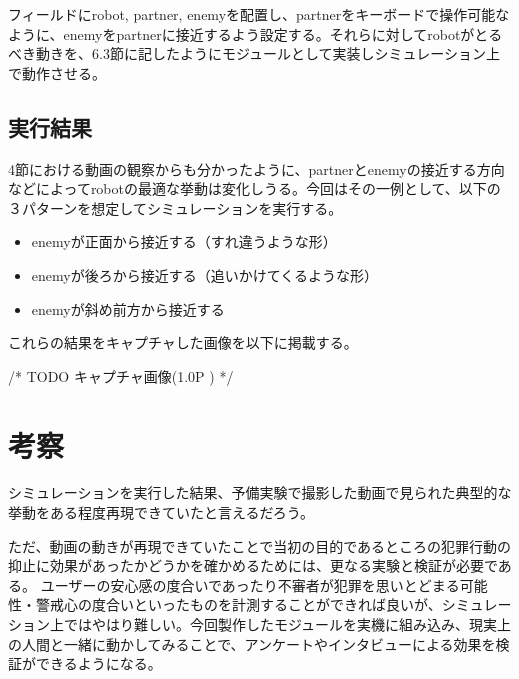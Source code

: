 \documentclass{kuisthesis}
\begin{document}
フィールドにrobot, partner, enemyを配置し、partnerをキーボードで操作可能なように、enemyをpartnerに接近するよう設定する。それらに対してrobotがとるべき動きを、6.3節に記したようにモジュールとして実装しシミュレーション上で動作させる。


\subsection{実行結果}

4節における動画の観察からも分かったように、partnerとenemyの接近する方向などによってrobotの最適な挙動は変化しうる。今回はその一例として、以下の３パターンを想定してシミュレーションを実行する。

\begin{itemize}
	\item enemyが正面から接近する（すれ違うような形）
	\item enemyが後ろから接近する（追いかけてくるような形）
	\item enemyが斜め前方から接近する
\end{itemize}

これらの結果をキャプチャした画像を以下に掲載する。

/* TODO キャプチャ画像(1.0P ) */







\section{考察}

シミュレーションを実行した結果、予備実験で撮影した動画で見られた典型的な挙動をある程度再現できていたと言えるだろう。

ただ、動画の動きが再現できていたことで当初の目的であるところの犯罪行動の抑止に効果があったかどうかを確かめるためには、更なる実験と検証が必要である。
ユーザーの安心感の度合いであったり不審者が犯罪を思いとどまる可能性・警戒心の度合いといったものを計測することができれば良いが、シミュレーション上ではやはり難しい。今回製作したモジュールを実機に組み込み、現実上の人間と一緒に動かしてみることで、アンケートやインタビューによる効果を検証ができるようになる。
\end{document}
